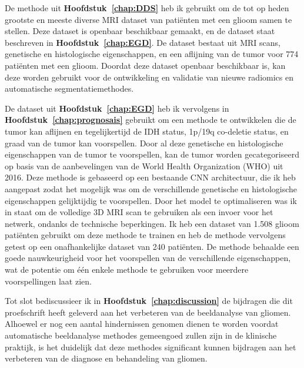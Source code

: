 De methode uit \textbf{Hoofdstuk~\ref{chap:DDS}} heb ik gebruikt om de tot op heden grootste en meeste diverse MRI dataset van pati{\"e}nten met een glioom samen te stellen.
Deze dataset is openbaar beschikbaar gemaakt, en de dataset staat beschreven in \textbf{Hoofdstuk~\ref{chap:EGD}}.
De dataset bestaat uit MRI scans, genetische en histologische eigenschappen, en een aflijning van de tumor voor 774 pati{\"e}nten met een glioom.
Doordat deze dataset openbaar beschikbaar is, kan deze worden gebruikt voor de ontwikkeling en validatie van nieuwe radiomics en automatische segmentatiemethodes.

De dataset uit \textbf{Hoofdstuk~\ref{chap:EGD}}  heb ik vervolgens in \textbf{Hoofdstuk~\ref{chap:prognosais}} gebruikt om een methode te ontwikkelen die de tumor kan aflijnen en tegelijkertijd de IDH status, 1p/19q co-deletie status, en graad van de tumor kan voorspellen.
Door al deze genetische en histologische eigenschappen van de tumor te voorspellen, kan de tumor worden gecategoriseerd op basis van de aanbevelingen van de World Health Organization (WHO) uit 2016.
Deze methode is gebaseerd op een bestaande CNN architectuur, die ik heb aangepast zodat het mogelijk was om de verschillende genetische en histologische eigenschappen gelijktijdig te voorspellen.
Door het model te optimaliseren was ik in staat om de volledige 3D MRI scan te gebruiken als een invoer voor het netwerk, ondanks de technische beperkingen.
Ik heb een dataset van 1.508 glioom pati{\"e}nten gebruikt om deze methode te trainen en heb de methode vervolgens getest op een onafhankelijke dataset van 240 pati{\"e}nten.
De methode behaalde een goede nauwkeurigheid voor het voorspellen van de verschillende eigenschappen, wat de potentie om {\'e}{\'e}n enkele methode te gebruiken voor meerdere voorspellingen laat zien.

Tot slot bediscussieer ik in \textbf{Hoofdstuk~\ref{chap:discussion}} de bijdragen die dit proefschrift heeft geleverd aan het verbeteren van de beeldanalyse van gliomen.
Alhoewel er nog een aantal hindernissen genomen dienen te worden voordat automatische beeldanalyse methodes gemeengoed zullen zijn in de klinische praktijk, is het duidelijk dat deze methodes significant kunnen bijdragen aan het verbeteren van de diagnose en behandeling van gliomen.


